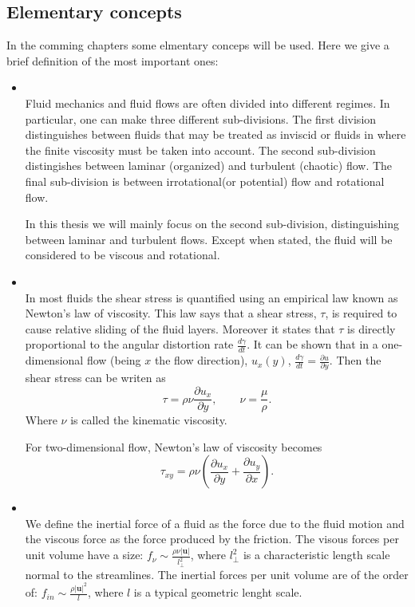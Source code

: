 \subsection{Elementary concepts}
In the comming chapters some elmentary conceps will be used. Here we give a brief definition of the most important ones:
\begin{itemize}
\item{}\\Fluid mechanics and fluid flows are often divided into different regimes. In particular, one can make three different sub-divisions. The first division distinguishes between fluids that may be treated as inviscid or fluids in where the finite viscosity must be taken into account. The second sub-division distingishes between laminar (organized) and turbulent (chaotic) flow. The final sub-division is between irrotational(or potential) flow and rotational flow.

In this thesis we will mainly focus on the second sub-division, distinguishing between laminar and turbulent flows. Except when stated, the fluid will be considered to be viscous and rotational.

\item{}\\In most fluids the shear stress is quantified using an empirical law known as Newton's law of viscosity. This law says that a shear stress, $\tau$, is required to cause relative sliding of the fluid layers. Moreover it states that $\tau$ is directly proportional to the angular distortion rate $\frac{d\gamma}{dt}$. It can be shown that in a one-dimensional flow (being $x$ the flow direction), $ u_x(y) $, $ \frac{d\gamma}{dt}=\frac{\partial u}{\partial y} $. Then the shear stress can be writen as
$$\tau=\rho\nu\frac{\partial u_x}{\partial y},\quad\quad\nu=\frac{\mu}{\rho}.$$
Where $ \nu $ is called the kinematic viscosity.

For two-dimensional flow, Newton's law of viscosity becomes
$$ \tau_{xy}=\rho\nu\left(\frac{\partial u_x}{\partial y}+\frac{\partial u_y}{\partial x}\right). $$


\item{}\\We define the inertial force of a fluid as the force due to the fluid motion and the viscous force as the force produced by the friction. The visous forces per unit volume have a size: $ f_\nu\sim\frac{\rho\nu|\mathbf{u}|}{l_\bot^2} $, where $ l_\bot^2 $ is a characteristic length scale normal to the streamlines. The inertial forces per unit volume are of the order of: $ f_{in}\sim\frac{\rho |\mathbf{u}|^2}{l} $, where $ l $ is a typical geometric lenght scale. 


\end{itemize}

